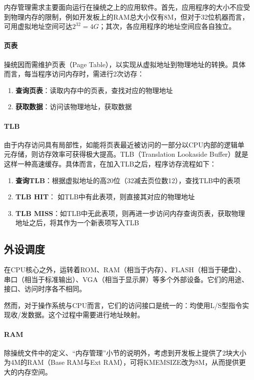 内存管理需求主要面向运行在操统之上的应用软件。首先，应用程序的大小不应受到物理内存的限制，例如开发板上的RAM总大小仅有8M，但对于32位机器而言，可用虚拟地址空间可达$2^{32} = 4G$；其次，各应用程序的地址空间应各自独立。

\paragraph{页表}
操统因而需维护页表（Page Table），以实现从虚拟地址到物理地址的转换。具体而言，每当程序访问内存时，需进行2次访存：
\begin{enumerate}
    \item {\bf 查询页表}：读取内存中的页表，查找对应的物理地址
    \item {\bf 获取数据}：访问该物理地址，获取数据
\end{enumerate}


\paragraph{TLB}
由于内存访问具有局部性，如能将页表最近被访问的一部分以CPU内部的逻辑单元存储，则访存效率可获得极大提高。TLB（Translation Lookaside Buffer）就是这样一种高速缓存。具体而言，在加入TLB之后，程序访存流程如下：

\begin{enumerate}
    \item {\bf 查询TLB}：根据虚拟地址的高20位（32减去页位数12），查找TLB中的表项
    \item {\bf TLB HIT}： 如TLB中有此表项，则直接其对应的物理地址
    \item {\bf TLB MISS}：如TLB中无此表项，则再进一步访问内存查询页表，获取物理地址之后，将其作为一个新表项写入TLB
\end{enumerate}

\subsection{外设调度}

在CPU核心之外，运转着ROM、RAM（相当于内存）、FLASH（相当于硬盘）、串口（相当于标准输出）、VGA（相当于显示屏）等多个外部设备。它们的用途、接口、访问时序各不相同。

然而，对于操作系统与CPU而言，它们的访问接口是统一的：均使用L/S型指令实现收/发数据。这个过程中需要进行地址映射。

\paragraph{RAM}
除操统文件中的定义、``内存管理''小节的说明外，考虑到开发板上提供了2块大小为4M的RAM（Base RAM与Ext RAM），可将KMEMSIZE改为8M，从而提供更大的内存空间。

